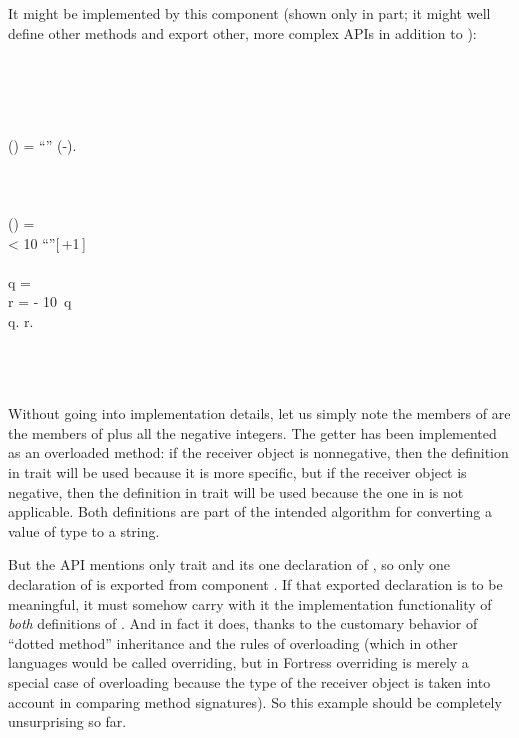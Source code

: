 It might be implemented by this component (shown only in part; it might well define
other methods and export other, more complex APIs in addition to ):
\begin{codeexamplesize}
\begin{FortressCode}
  \\
  \\
 \\
  \\
\2\+ (\ultrathin) = \hbox{\rm{}``\STR{{-}}''} \mathrel{\Vert} (-\;).\- \\
 \\
 \\
    \\
\2\+ (\ultrathin) = \\
  \2\+\;\;  < 10  \hbox{\rm{}``''}[\,\COLONOP{}+1\,] \\
     \\
    \2\+q =\;   \\
      r =\;  - 10\, q \\
      q. \mathrel{\Vert} r.\- \\
    \-\- \\
 \\
 \\
 
\end{FortressCode}
\end{codeexamplesize}
Without going into implementation details, let us simply note
the members of  are the members of  plus all the
negative integers.  The getter  has been implemented
as an overloaded method: if the receiver object is
nonnegative, then the definition in trait  will be used
because it is more specific, but if the receiver object
is negative, then the definition in trait  will be used
because the one in  is not applicable.  Both definitions
are part of the intended algorithm for converting
a value of type  to a string.

But the API mentions only trait  and its one declaration of , so only
one declaration of  is exported from component .
If that exported declaration is to be meaningful,
it must somehow carry with it the implementation functionality
of \emph{both} definitions of .
And in fact it does, thanks to the customary behavior of
``dotted method'' inheritance and the rules of overloading
(which in other languages would be called overriding,
but in Fortress overriding is merely a special case of
overloading because the type of the receiver object is
taken into account in comparing method signatures).
So this example should be completely unsurprising so far.

